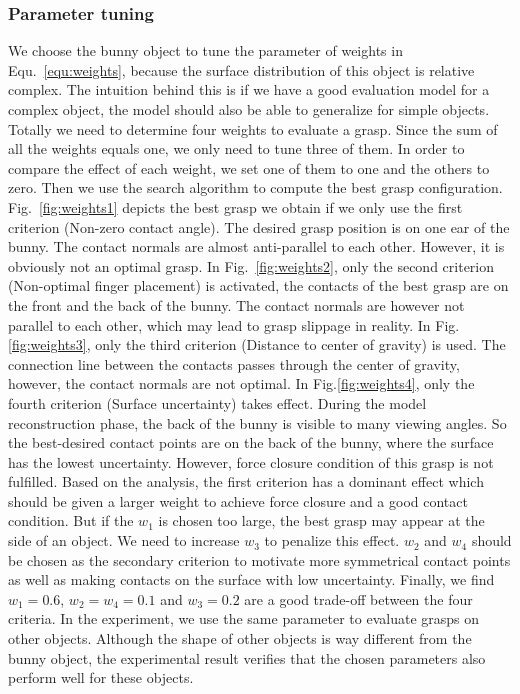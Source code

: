 \subsubsection{Parameter tuning}
We choose the bunny object to tune the parameter of weights in Equ.~\ref{equ:weights}, because the surface distribution of this object is relative complex. The intuition behind this is if we have a good evaluation model for a complex object, the model should also be able to generalize for simple objects.  Totally we need to determine four weights to evaluate a grasp. Since the sum of all the weights equals one, we only need to tune three of them. In order to compare the effect of each weight, we set one of them to one and the others to zero. Then we use the search algorithm to compute the best grasp configuration. Fig.~\ref{fig:weights1} depicts the best grasp we obtain if we only use the first criterion (Non-zero contact angle). The desired grasp position is on one ear of the bunny. The contact normals are almost anti-parallel to each other. However, it is obviously not an optimal grasp. In Fig.~\ref{fig:weights2}, only the second criterion (Non-optimal finger placement) is activated, the contacts of the best grasp are on the front and the back of the bunny. The contact normals are however not parallel to each other, which may lead to grasp slippage in reality. In Fig.\ref{fig:weights3}, only the third criterion (Distance to center of gravity) is used. The connection line between the contacts passes through the center of gravity, however, the contact normals are not optimal. In Fig.\ref{fig:weights4}, only the fourth criterion (Surface uncertainty) takes effect. During the model reconstruction phase, the back of the bunny is visible to many viewing angles. So the best-desired contact points are on the back of the bunny, where the surface has the lowest uncertainty. However, force closure condition of this grasp is not fulfilled. Based on the analysis, the first criterion has a dominant effect which should be given a larger weight to achieve force closure and a good contact condition. But if the $w_1$ is chosen too large, the best grasp may appear at the side of an object. We need to increase $w_3$ to penalize this effect. $w_2$ and $w_4$ should be chosen as the secondary criterion to motivate more symmetrical contact points as well as making contacts on the surface with low uncertainty. Finally, we find $w_1= 0.6$, $w_2 = w_4 = 0.1$ and $w_3 = 0.2$ are a good trade-off between the four criteria. In the experiment, we use the same parameter to evaluate grasps on other objects. Although the shape of other objects is way different from the bunny object, the experimental result verifies that the chosen parameters also perform well for these objects.

